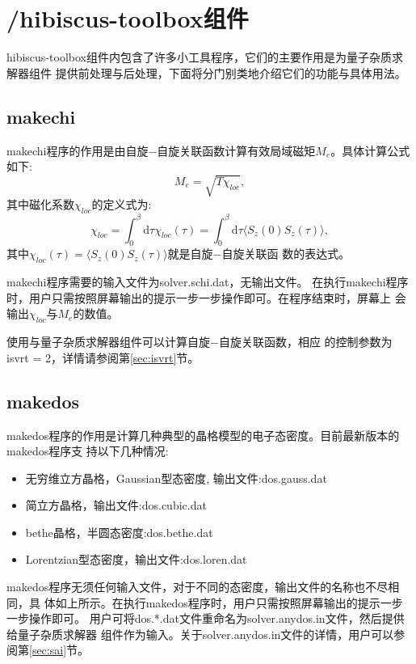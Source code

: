 \section{{\hibiscus}/hibiscus-toolbox组件}
\label{sec:hib-tool}

hibiscus-toolbox组件内包含了许多小工具程序，它们的主要作用是为量子杂质求解器组件
提供前处理与后处理，下面将分门别类地介绍它们的功能与具体用法。

\subsection{makechi}
makechi程序的作用是由自旋$-$自旋关联函数计算有效局域磁矩$M_{e}$。具体计算公式如下:
\begin{equation}
M_e = \sqrt{T \chi_{loc}},
\end{equation} 
其中磁化系数$\chi_{loc}$的定义式为:
\begin{equation}
\label{eq:chi_eq}
\chi_{loc} = \int^{\beta}_{0} \text{d}\tau \chi_{loc}(\tau) 
           = \int^{\beta}_{0} \text{d}\tau \langle S_{z}(0) S_{z}(\tau) \rangle,
\end{equation}
其中$\chi_{loc}(\tau) = \langle S_z(0) S_z(\tau) \rangle$就是自旋$-$自旋关联函
数的表达式。

makechi程序需要的输入文件为solver.schi.dat，无输出文件。
在执行makechi程序时，用户只需按照屏幕输出的提示一步一步操作即可。在程序结束时，屏幕上
会输出$\chi_{loc}$与$M_{e}$的数值。

使用{\gardenia}与{\narcissus}量子杂质求解器组件可以计算自旋$-$自旋关联函数，相应
的控制参数为isvrt = 2，详情请参阅第\ref{sec:isvrt}节。

\subsection{makedos}
makedos程序的作用是计算几种典型的晶格模型的电子态密度。目前最新版本的makedos程序支
持以下几种情况:

\begin{itemize}
\item 无穷维立方晶格，Gaussian型态密度, 输出文件:dos.gauss.dat
\item 简立方晶格，输出文件:dos.cubic.dat
\item bethe晶格，半圆态密度:dos.bethe.dat
\item Lorentzian型态密度，输出文件:dos.loren.dat
\end{itemize}

makedos程序无须任何输入文件，对于不同的态密度，输出文件的名称也不尽相同，具
体如上所示。在执行makedos程序时，用户只需按照屏幕输出的提示一步一步操作即可。
用户可将dos.*.dat文件重命名为solver.anydos.in文件，然后提供给量子杂质求解器
组件作为输入。关于solver.anydos.in文件的详情，用户可以参阅第\ref{sec:sai}节。

